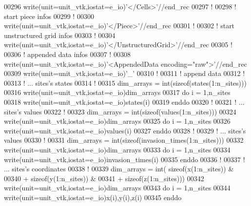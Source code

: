 \begin{DoxyCode}
00296 \textcolor{keyword}{write}(unit=unit\_vtk,iostat=e\_io)\textcolor{stringliteral}{'</Cells>'}//end\_rec
00297 \textcolor{comment}{!}
00298 \textcolor{comment}{! start piece infos}
00299 \textcolor{comment}{!}
00300 \textcolor{keyword}{write}(unit=unit\_vtk,iostat=e\_io)\textcolor{stringliteral}{'</Piece>'}//end\_rec
00301 \textcolor{comment}{!}
00302 \textcolor{comment}{! start unstructured grid infos}
00303 \textcolor{comment}{!}
00304 \textcolor{keyword}{write}(unit=unit\_vtk,iostat=e\_io)\textcolor{stringliteral}{'</UnstructuredGrid>'}//end\_rec
00305 \textcolor{comment}{!}
00306 \textcolor{comment}{! appended data infos}
00307 \textcolor{comment}{!}
00308 \textcolor{keyword}{write}(unit=unit\_vtk,iostat=e\_io)\textcolor{stringliteral}{'<AppendedData encoding="raw">'}//end\_rec
00309 \textcolor{keyword}{write}(unit=unit\_vtk,iostat=e\_io)\textcolor{stringliteral}{'\_'}
00310 \textcolor{comment}{!}
00311 \textcolor{comment}{! append data }
00312 \textcolor{comment}{!}
00313 \textcolor{comment}{! ... sites's states}
00314 \textcolor{comment}{!}
00315 dim\_arrays = int(sizeof(states(1:n\_sites)))
00316 \textcolor{keyword}{write}(unit=unit\_vtk,iostat=e\_io)dim\_arrays
00317 \textcolor{keyword}{do} i = 1,n\_sites
00318    \textcolor{keyword}{write}(unit=unit\_vtk,iostat=e\_io)states(i)
00319 \textcolor{keyword}{enddo}
00320 \textcolor{comment}{!}
00321 \textcolor{comment}{! ... sites's values}
00322 \textcolor{comment}{!}
00323 dim\_arrays = int(sizeof(values(1:n\_sites)))
00324 \textcolor{keyword}{write}(unit=unit\_vtk,iostat=e\_io)dim\_arrays
00325 \textcolor{keyword}{do} i = 1,n\_sites
00326    \textcolor{keyword}{write}(unit=unit\_vtk,iostat=e\_io)values(i)
00327 \textcolor{keyword}{enddo}
00328 \textcolor{comment}{!}
00329 \textcolor{comment}{! ... sites's values}
00330 \textcolor{comment}{!}
00331 dim\_arrays = int(sizeof(invasion\_times(1:n\_sites)))
00332 \textcolor{keyword}{write}(unit=unit\_vtk,iostat=e\_io)dim\_arrays
00333 \textcolor{keyword}{do} i = 1,n\_sites
00334    \textcolor{keyword}{write}(unit=unit\_vtk,iostat=e\_io)invasion\_times(i)
00335 \textcolor{keyword}{enddo}
00336 \textcolor{comment}{!}
00337 \textcolor{comment}{! ... sites's coordinates}
00338 \textcolor{comment}{!}
00339 dim\_arrays =  int( sizeof(x(1:n\_sites)) &
00340                  + sizeof(y(1:n\_sites)) &
00341                  + sizeof(z(1:n\_sites)))
00342 \textcolor{keyword}{write}(unit=unit\_vtk,iostat=e\_io)dim\_arrays
00343 \textcolor{keyword}{do} i = 1,n\_sites
00344    \textcolor{keyword}{write}(unit=unit\_vtk,iostat=e\_io)x(i),y(i),z(i)
00345 \textcolor{keyword}{enddo}

\end{DoxyCode}
